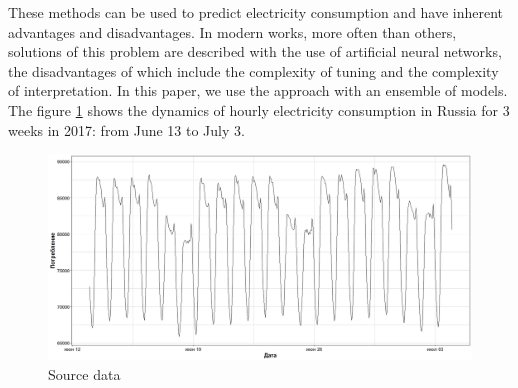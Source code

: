 \documentclass[11pt]{article}
\begin{document}
These methods can be used to predict electricity consumption and have inherent advantages and disadvantages. In modern works, more often than others, solutions of this problem are described with the use of artificial neural networks, the disadvantages of which include the complexity of tuning and the complexity of interpretation. In this paper, we use the approach with an ensemble of models. The figure \ref{fig:data} shows the dynamics of hourly electricity consumption in Russia for 3 weeks in 2017: from June 13 to July 3.
\begin{figure}
  \centering
  \includegraphics[width=0.6\linewidth]{train_dataset.jpeg}
  \caption{Source data}
  \label{fig:data}
\end{figure}
\end{document}
